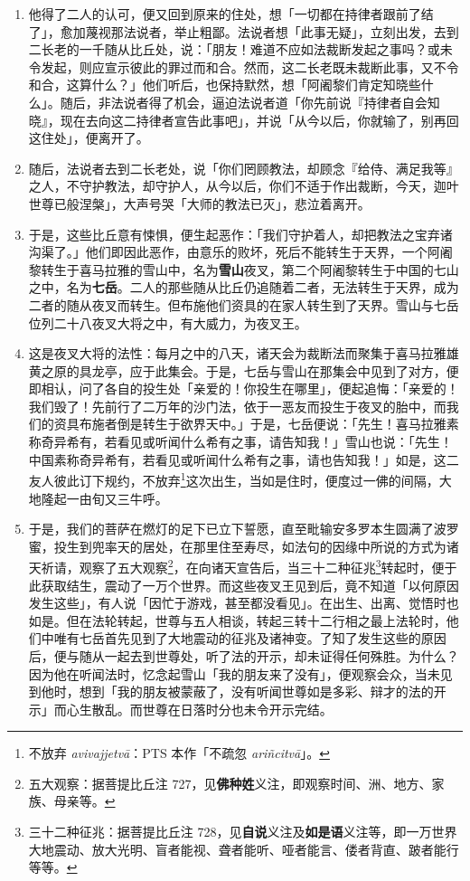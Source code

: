 \begin{enumerate}
\item 他得了二人的认可，便又回到原来的住处，想「一切都在持律者跟前了结了」，愈加蔑视那法说者，举止粗鄙。法说者想「此事无疑」，立刻出发，去到二长老的一千随从比丘处，说：「朋友！难道不应如法裁断发起之事吗？或未令发起，则应宣示彼此的罪过而和合。然而，这二长老既未裁断此事，又不令和合，这算什么？」他们听后，也保持默然，想「阿阇黎们肯定知晓些什么」。随后，非法说者得了机会，逼迫法说者道「你先前说『持律者自会知晓』，现在去向这二持律者宣告此事吧」，并说「从今以后，你就输了，别再回这住处」，便离开了。
\item 随后，法说者去到二长老处，说「你们罔顾教法，却顾念『给侍、满足我等』之人，不守护教法，却守护人，从今以后，你们不适于作出裁断，今天，迦叶世尊已般涅槃」，大声号哭「大师的教法已灭」，悲泣着离开。
\item 于是，这些比丘意有悚惧，便生起恶作：「我们守护着人，却把教法之宝弃诸沟渠了。」他们即因此恶作，由意乐的败坏，死后不能转生于天界，一个阿阇黎转生于喜马拉雅的雪山中，名为\textbf{雪山}夜叉，第二个阿阇黎转生于中国的七山之中，名为\textbf{七岳}。二人的那些随从比丘仍追随着二者，无法转生于天界，成为二者的随从夜叉而转生。但布施他们资具的在家人转生到了天界。雪山与七岳位列二十八夜叉大将之中，有大威力，为夜叉王。
\item 这是夜叉大将的法性：每月之中的八天，诸天会为裁断法而聚集于喜马拉雅雄黄之原的具龙亭，应于此集会。于是，七岳与雪山在那集会中见到了对方，便即相认，问了各自的投生处「亲爱的！你投生在哪里」，便起追悔：「亲爱的！我们毁了！先前行了二万年的沙门法，依于一恶友而投生于夜叉的胎中，而我们的资具布施者倒是转生于欲界天中。」于是，七岳便说：「先生！喜马拉雅素称奇异希有，若看见或听闻什么希有之事，请告知我！」雪山也说：「先生！中国素称奇异希有，若看见或听闻什么希有之事，请也告知我！」如是，这二友人彼此订下规约，不放弃\footnote{不放弃 \textit{avivajjetvā}：PTS 本作「不疏忽 \textit{ariñcitvā}」。}这次出生，当如是住时，便度过一佛的间隔，大地隆起一由旬又三牛呼。
\item 于是，我们的菩萨在燃灯的足下已立下誓愿，直至毗输安多罗本生圆满了波罗蜜，投生到兜率天的居处，在那里住至寿尽，如法句的因缘中所说的方式为诸天祈请，观察了五大观察\footnote{五大观察：据菩提比丘注 727，见\textbf{佛种姓}义注，即观察时间、洲、地方、家族、母亲等。}，在向诸天宣告后，当三十二种征兆\footnote{三十二种征兆：据菩提比丘注 728，见\textbf{自说}义注及\textbf{如是语}义注等，即一万世界大地震动、放大光明、盲者能视、聋者能听、哑者能言、偻者背直、跛者能行等等。}转起时，便于此获取结生，震动了一万个世界。而这些夜叉王见到后，竟不知道「以何原因发生这些」，有人说「因忙于游戏，甚至都没看见」。在出生、出离、觉悟时也如是。但在法轮转起，世尊与五人相谈，转起三转十二行相之最上法轮时，他们中唯有七岳首先见到了大地震动的征兆及诸神变。了知了发生这些的原因后，便与随从一起去到世尊处，听了法的开示，却未证得任何殊胜。为什么？因为他在听闻法时，忆念起雪山「我的朋友来了没有」，便观察会众，当未见到他时，想到「我的朋友被蒙蔽了，没有听闻世尊如是多彩、辩才的法的开示」而心生散乱。而世尊在日落时分也未令开示完结。

\end{enumerate}
